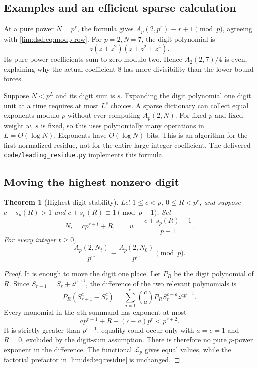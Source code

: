 \documentclass[11pt]{article}
\newtheorem{theorem}{Theorem}[section]
\theoremstyle{definition}
\theoremstyle{remark}
\newcommand{\Lfun}{\mathcal L_p}
\begin{document}
\subsection{Examples and an efficient sparse calculation}

At a pure power $N=p^r$, the formula gives
$A_p(2,p^r)\equiv r+1\pmod p$, agreeing with
\eqref{lim:dsd:eq:modp-row}. For $p=2,N=7$, the digit polynomial is
\[
 z(z+z^2)(z+z^2+z^4).
\]
Its pure-power coefficients sum to zero modulo two. Hence
$A_2(2,7)/4$ is even, explaining why the actual coefficient $8$
has more divisibility than the lower bound forces.

Suppose $N<p^L$ and its digit sum is $s$. Expanding the digit
polynomial one digit unit at a time requires at most $L^s$ choices.
A sparse dictionary can collect equal exponents modulo $p$ without
ever computing $A_p(2,N)$. For fixed $p$ and fixed weight $w$, $s$ is
fixed, so this uses polynomially many operations in $L=O(\log N)$.
Exponents have $O(\log N)$ bits. This is an algorithm for the first
normalized residue, not for the entire large integer coefficient.
The delivered \texttt{code/leading\_residue.py} implements this formula.

\subsection{Moving the highest nonzero digit}

\begin{theorem}[Highest-digit stability]
\label{lim:dsd:thm:stability}
Let $1\le c<p$, $0\le R<p^r$, and suppose
$c+s_p(R)>1$ and $c+s_p(R)\equiv1\pmod{p-1}$. Set
\[
 N_t=cp^{r+t}+R,\qquad
 w=\frac{c+s_p(R)-1}{p-1}.
\]
For every integer $t\ge0$,
\begin{equation}
 \frac{A_p(2,N_t)}{p^w}\equiv
 \frac{A_p(2,N_0)}{p^w}\pmod p.
 \label{lim:dsd:eq:highest-stability}
\end{equation}
\end{theorem}
\begin{proof}
It is enough to move the digit one place. Let $P_R$ be the digit
polynomial of $R$. Since $S_{r+1}=S_r+z^{p^{r+1}}$, the difference
of the two relevant polynomials is
\[
 P_R(S_{r+1}^c-S_r^c)
 =\sum_{a=1}^c\binom ca P_RS_r^{c-a}z^{ap^{r+1}}.
\]
Every monomial in the $a$th summand has exponent at most
\[
 ap^{r+1}+R+(c-a)p^r<p^{r+2}.
\]
It is strictly greater than $p^{r+1}$: equality could occur only
with $a=c=1$ and $R=0$, excluded by the digit-sum assumption.
There is therefore no pure $p$-power exponent in the difference.
The functional $\Lfun$ gives equal values, while the factorial
prefactor in \eqref{lim:dsd:eq:residue} is unchanged.
\end{proof}
\end{document}
